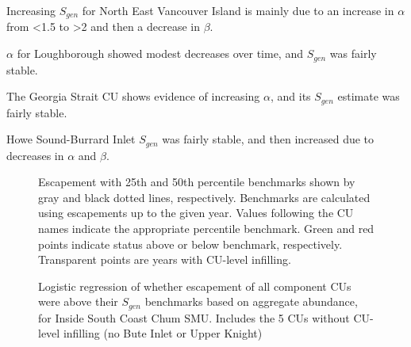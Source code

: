 \documentclass[11pt]{book}
\begin{document}
Increasing \(S_{gen}\) for North East Vancouver Island is mainly due to an increase in \(\alpha\) from \textless1.5 to \textgreater2 and then a decrease in \(\beta\).

\(\alpha\) for Loughborough showed modest decreases over time, and \(S_{gen}\) was fairly stable.

The Georgia Strait CU shows evidence of increasing \(\alpha\), and its \(S_{gen}\) estimate was fairly stable.

Howe Sound-Burrard Inlet \(S_{gen}\) was fairly stable, and then increased due to decreases in \(\alpha\) and \(\beta\).
\begin{figure}[htb]

{\centering {} 

}

\caption{Escapement with 25th and 50th percentile benchmarks shown by gray and black dotted lines, respectively. Benchmarks are calculated using escapements up to the given year. Values following the CU names indicate the appropriate percentile benchmark. Green and red points indicate status above or below benchmark, respectively. Transparent points are years with CU-level infilling.}\label{fig:chum-perc-retro}
\end{figure}
\begin{figure}[htb]

{\centering {} 

}

\caption{Logistic regression of whether escapement of all component CUs were above their $S_{gen}$ benchmarks based on aggregate abundance, for Inside South Coast Chum SMU. Includes the 5 CUs without CU-level infilling (no Bute Inlet or Upper Knight)}\label{fig:chum-logistic-sgen}
\end{figure}
\end{document}
